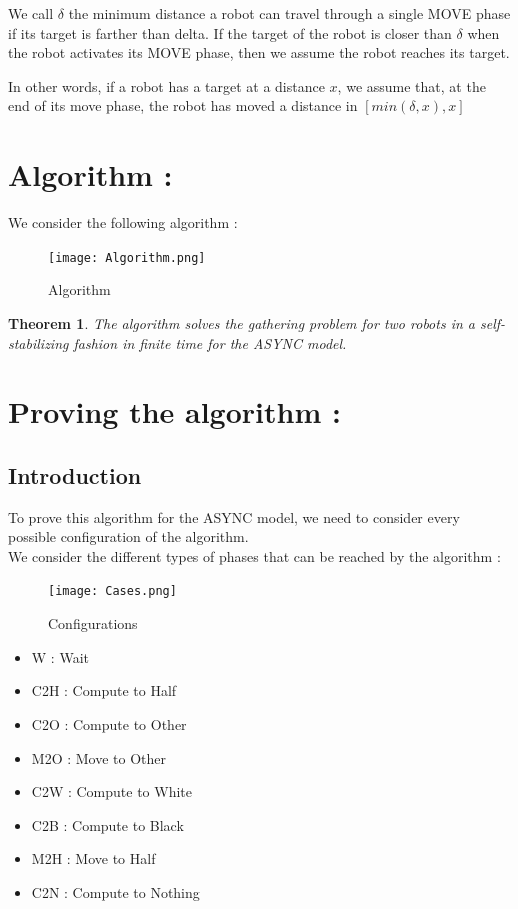 \documentclass[11pt]{article}
\newtheorem{Theorem}{Theorem}
\begin{document}
We call $\delta$ the minimum distance a robot can travel through a single MOVE phase if its target is farther than delta. If the target of the robot is closer than $\delta$ when the robot activates its MOVE phase, then we assume the robot reaches its target.

In other words, if a robot has a target at a distance $x$, we assume that, at the end of its move phase, the robot has moved a distance in $[min(\delta,x),x]$
\section{Algorithm :}

We consider the following algorithm :

\begin{figure}[H]
	\centering
	\texttt{[image: Algorithm.png]}
	\caption{Algorithm}
\end{figure}

\begin{Theorem}
The algorithm solves the gathering problem for two robots in a self-stabilizing fashion in finite time for the ASYNC model.
\end{Theorem}

\section{Proving the algorithm :}

\subsection{Introduction}

To prove this algorithm for the ASYNC model, we need to consider every possible configuration of the algorithm.
\\
We consider the different types of phases that can be reached by the algorithm : 
\begin{figure}[H]
	\centering
	\texttt{[image: Cases.png]}
	\caption{Configurations}
\end{figure}

\begin{itemize}
\item W : Wait
\item C2H : Compute to Half
\item C2O : Compute to Other
\item M2O : Move to Other
\item C2W : Compute to White
\item C2B : Compute to Black
\item M2H : Move to Half
\item C2N : Compute to Nothing
\end{itemize}
\end{document}
